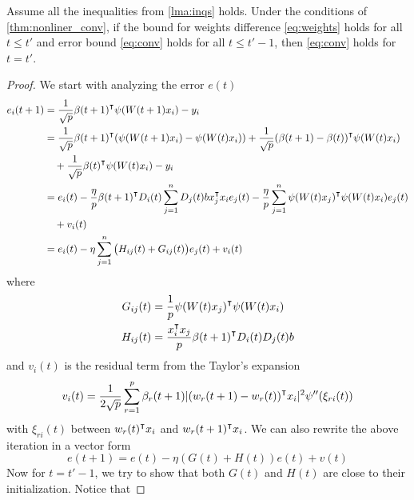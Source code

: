 \begin{lemma}
\label{lma:induction}
Assume all the inequalities from \cref{lma:inqs} holds. Under the conditions of \cref{thm:nonliner_conv}, if the bound for weights difference \eqref{eq:weights} holds for all $t\leq t'$ and error bound \eqref{eq:conv} holds for all $t\leq t'-1$, then \eqref{eq:conv} holds for $t=t'$.
\end{lemma}
\begin{proof}
We start with analyzing the error $e(t)$
\begin{equation*}
\begin{aligned}
    e_i(t+1) 
    &= \frac{1}{\sqrt p}\beta(t+1)\transpose\psi(W(t+1)x_i) - y_i \\
    &= \frac{1}{\sqrt p}\beta(t+1)\transpose(\psi(W(t+1)x_i)-\psi(W(t)x_i))+ \frac{1}{\sqrt p}(\beta(t+1)-\beta(t))\transpose \psi(W(t)x_i) \\
    & \quad + \frac{1}{\sqrt p}\beta(t)\transpose \psi(W(t)x_i) - y_i \\
    &=e_i(t) - \frac{\eta}{p}\beta(t+1)\transpose D_i(t)\sum_{j=1}^nD_j(t)b x_j\transpose x_i e_j(t)  - \frac{\eta}{p}\sum_{j=1}^n\psi(W(t)x_j)\transpose\psi(W(t)x_i)e_j(t) \\
    & \quad + v_i(t) \\
    & = e_i(t)-\eta\sum_{j=1}^n\big(H_{ij}(t)+G_{ij}(t)\big)e_j(t) + v_i(t)
\end{aligned}
\end{equation*}
where
\begin{equation*}
\begin{aligned}
G_{ij}(t) &= \frac{1}{p}\psi(W(t)x_j)\transpose\psi(W(t)x_i) \\
H_{ij}(t) &= \frac{x_i\transpose x_j}{p}\beta(t+1)\transpose D_i(t)D_j(t)b
\end{aligned}
\end{equation*}
and $v_i(t)$ is the residual term from the Taylor's expansion
\begin{equation*}
    v_i(t) = \frac{1}{2\sqrt p}\sum_{r=1}^p\beta_r(t+1)|(w_r(t+1)-w_r(t))\transpose x_i|^2\psi''(\xi_{ri}(t))
\end{equation*}
with $\xi_{ri}(t)$ between $w_r(t)\transpose x_i$ and $w_r(t+1)\transpose x_i$. We can also rewrite the above iteration in a vector form
\begin{equation}\label{eq:et_iter}
     e(t+1) = e(t) - \eta(G(t)+H(t))e(t) + v(t)
\end{equation} 
Now for $t=t'-1$, we try to show that both $G(t)$ and $H(t)$ are close to their initialization. Notice that

\end{proof}
